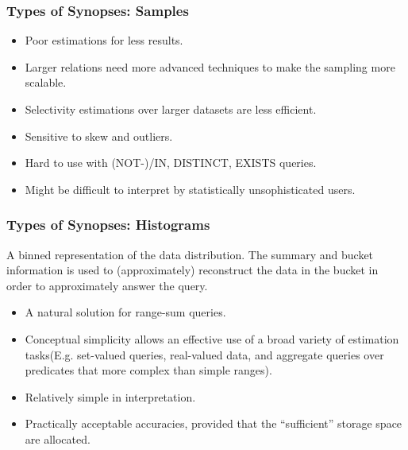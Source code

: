 \documentclass{beamer}
\begin{document}
\begin{frame}
\frametitle{Types of Synopses: Samples}
\begin{itemize}
\item{Poor estimations for less results.}
\item{Larger relations need more advanced techniques to make the sampling more scalable.}
\item{Selectivity estimations over larger datasets are less efficient.}
\item{Sensitive to skew and outliers.}
\item{Hard to use with (NOT-)/IN, DISTINCT, EXISTS queries.}
\item{Might be difficult to interpret by statistically unsophisticated users.}
\end{itemize}
\end{frame}

\begin{frame}
\frametitle{Types of Synopses: Histograms}
A binned representation of the data distribution. The summary and bucket information is
used to (approximately) reconstruct the data in the bucket in order
to approximately answer the query.\pause
\vspace{0.2 cm}
\begin{itemize}
\item{A natural solution for range-sum queries.}
\item{Conceptual simplicity allows an effective use of a broad variety of estimation tasks(E.g. set-valued queries, real-valued data, and aggregate queries over predicates that more complex than simple ranges).}
\item{Relatively simple in interpretation.}
\item{Practically acceptable accuracies, provided that the “sufficient” storage space are allocated.}
\end{itemize}
\end{frame}
\end{document}
